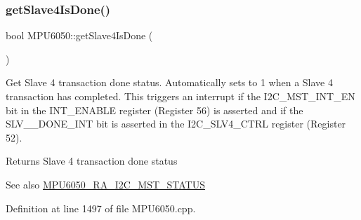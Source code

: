 \begin{DoxyCode}{0}

\end{DoxyCode}
\mbox{\label{classMPU6050_a105aefe645e7021f9ba4397e9df4114c}} 
\subsubsection{\texorpdfstring{getSlave4IsDone()}{getSlave4IsDone()}}
{\footnotesize\ttfamily bool M\+P\+U6050\+::get\+Slave4\+Is\+Done (\begin{DoxyParamCaption}{ }\end{DoxyParamCaption})}

Get Slave 4 transaction done status. Automatically sets to 1 when a Slave 4 transaction has completed. This triggers an interrupt if the I2\+C\+\_\+\+M\+S\+T\+\_\+\+I\+N\+T\+\_\+\+EN bit in the I\+N\+T\+\_\+\+E\+N\+A\+B\+LE register (Register 56) is asserted and if the S\+L\+V\+\_\+\_\+\+D\+O\+N\+E\+\_\+\+I\+NT bit is asserted in the I2\+C\+\_\+\+S\+L\+V4\+\_\+\+C\+T\+RL register (Register 52). \begin{DoxyReturn}{Returns}
Slave 4 transaction done status 
\end{DoxyReturn}
\begin{DoxySeeAlso}{See also}
\mbox{\hyperlink{MPU6050_8h_a5ef54580f436c198fb84d01288fbef49}{M\+P\+U6050\+\_\+\+R\+A\+\_\+\+I2\+C\+\_\+\+M\+S\+T\+\_\+\+S\+T\+A\+T\+US}} 
\end{DoxySeeAlso}


Definition at line 1497 of file M\+P\+U6050.\+cpp.


